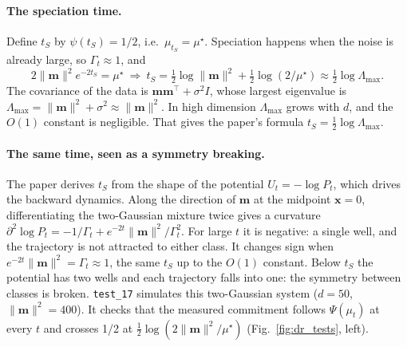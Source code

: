\paragraph{The speciation time.} Define $t_S$ by $\psi(t_S)=1/2$, i.e.\ $\mu_{t_S}=\mu^\star$. Speciation happens when
the noise is already large, so $\Gamma_t\approx1$, and
\begin{equation}\label{eq:ts_gauss}
2\|\bm m\|^2e^{-2t_S}=\mu^\star\ \Longrightarrow\ t_S=\tfrac12\log\|\bm m\|^2+\tfrac12\log(2/\mu^\star)\approx\tfrac12\log\Lambda_{\max}.
\end{equation}
The covariance of the data is $\bm m\bm m^\top+\sigma^2I$, whose largest eigenvalue is
$\Lambda_{\max}=\|\bm m\|^2+\sigma^2\approx\|\bm m\|^2$. In high dimension $\Lambda_{\max}$ grows with $d$, and the
$O(1)$ constant is negligible. That gives the paper's formula $t_S=\tfrac12\log\Lambda_{\max}$.

\paragraph{The same time, seen as a symmetry breaking.} The paper derives $t_S$ from the shape of the potential
$U_t=-\log P_t$, which drives the backward dynamics. Along the direction of $\bm m$ at the midpoint $\bm x=0$,
differentiating the two-Gaussian mixture twice gives a curvature
$\partial^2\log P_t=-1/\Gamma_t+e^{-2t}\|\bm m\|^2/\Gamma_t^2$. For large $t$ it is negative: a single well, and
the trajectory is not attracted to either class. It changes sign when $e^{-2t}\|\bm m\|^2=\Gamma_t\approx1$, the same
$t_S$ up to the $O(1)$ constant. Below $t_S$ the potential has two wells and each trajectory falls into one: the
symmetry between classes is broken. \texttt{test\_17} simulates this two-Gaussian system ($d=50$,
$\|\bm m\|^2=400$). It checks that the measured commitment follows $\Psi(\mu_t)$ at every $t$ and crosses 1/2 at
$\tfrac12\log(2\|\bm m\|^2/\mu^\star)$ (Fig.~\ref{fig:dr_tests}, left).


